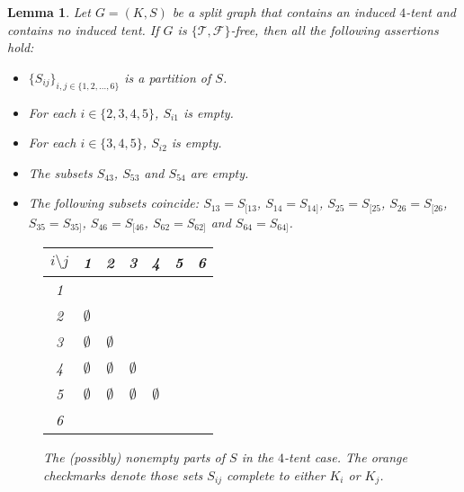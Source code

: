 \documentclass[12pt]{book}
\theoremstyle{plain}
\newtheorem{lema}[teo]{Lemma}
\theoremstyle{remark}
\begin{document}
\begin{lema} \label{lema:4tent_1} 
Let $G=(K,S)$ be a split graph that contains an induced $4$-tent and contains no induced tent. If $G$ is $\{ \mathcal{T}, \mathcal{F} \}$-free, then all the following assertions hold:
 \begin{itemize}
  \item $\{S_{ij}\}_{i,j\in\{1,2,\ldots,6\}}$ is a partition of $S$.
  \item For each $i\in\{2,3,4,5\}$, $S_{i1}$ is empty.
  \item For each $i\in\{3,4,5\}$, $S_{i2}$ is empty.
  \item The subsets $S_{43}$, $S_{53}$ and $S_{54}$ are empty. %
  \item The following subsets coincide: $S_{13}= S_{[13}$, $S_{14}=S_{14]}$, $S_{25}=S_{[25}$, $S_{26}=S_{[26}$, $S_{35}=S_{35]}$, $S_{46} = S_{[46}$, $S_{62} = S_{62]}$ and $S_{64} = S_{64]}$.
 \end{itemize}
 
\begin{figure}[h!]
	\begin{center}
		\begin{tabular}{ c | c c c c c c } 
			 \hline
			 $i\setminus j$ & 1 & 2 & 3 & 4 & 5 & 6 \\ 
			  \hline
			 1 & \checkmark & \checkmark & \textcolor{dark-orange}{\checkmark} & \textcolor{dark-orange}{\checkmark} & \checkmark & \checkmark \\ 
			 2 & $\emptyset$ & \checkmark & \checkmark & \checkmark & \textcolor{dark-orange}{\checkmark} & \textcolor{dark-orange}{\checkmark} \\
	 		 3 & $\emptyset$ & $\emptyset$ & \checkmark & \checkmark & \textcolor{dark-orange}{\checkmark} & \checkmark \\
			 4 & $\emptyset$ & $\emptyset$ & $\emptyset$ & \checkmark & \checkmark & \textcolor{dark-orange}{\checkmark} \\
			 5 & $\emptyset$ & $\emptyset$ & $\emptyset$ & $\emptyset$ & \checkmark & \checkmark \\
			 6 & \checkmark & \textcolor{dark-orange}{\checkmark} & \checkmark & \textcolor{dark-orange}{\checkmark} & \checkmark & \checkmark \\
		\end{tabular}
	\end{center}
	\caption{The (possibly) nonempty parts of $S$ in the $4$-tent case. The orange checkmarks denote those sets $S_{ij}$ complete to either $K_i$ or $K_j$.} 
\end{figure}

\end{lema}
\end{document}
